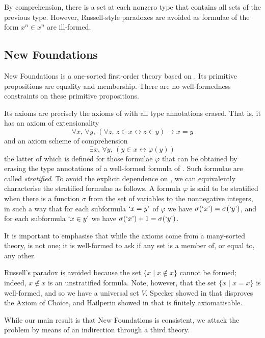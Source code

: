 By comprehension, there is a set at each nonzero type that contains all sets of the previous type.
However, Russell-style paradoxes are avoided as formulae of the form \( x^n \in x^n \) are ill-formed.

\subsection{New Foundations}

New Foundations is a one-sorted first-order theory based on {\TST}.
Its primitive propositions are equality and membership.
There are no well-formedness constraints on these primitive propositions.

Its axioms are precisely the axioms of {\TST} with all type annotations erased.
That is, it has an axiom of extensionality
\[ \forall x,\, \forall y,\, (\forall z,\, z \in x \leftrightarrow z \in y) \to x = y \]
and an axiom scheme of comprehension
\[ \exists x,\, \forall y,\, (y \in x \leftrightarrow \varphi(y)) \]
the latter of which is defined for those formulae \( \varphi \) that can be obtained by erasing the type annotations of a well-formed formula of {\TST}.
Such formulae are called \emph{stratified}.
To avoid the explicit dependence on {\TST}, we can equivalently characterise the stratified formulae as follows.
A formula \( \varphi \) is said to be stratified when there is a function \( \sigma \) from the set of variables to the nonnegative integers, in such a way that for each subformula \( \mquote{x = y} \) of \( \varphi \) we have \( \sigma(\mquote{x}) = \sigma(\mquote{y}) \), and for each subformula \( \mquote{x \in y} \) we have \( \sigma(\mquote{x}) + 1 = \sigma(\mquote{y}) \).

It is important to emphasise that while the axioms come from a many-sorted theory, {\NF} is not one; it is well-formed to ask if any set is a member of, or equal to, any other.

Russell's paradox is avoided because the set \( \{ x \mid x \notin x \} \) cannot be formed; indeed, \( x \notin x \) is an unstratified formula.
Note, however, that the set \( \{ x \mid x = x \} \) is well-formed, and so we have a universal set \( V \).
Specker showed in \cite{specker-choice-nf} that {\NF} disproves the Axiom of Choice, and Hailperin showed in \cite{hailperin-finite-axiomatisation} that {\NF} is finitely axiomatisable.

While our main result is that New Foundations is consistent, we attack the problem by means of an indirection through a third theory.

